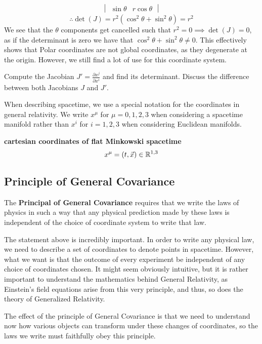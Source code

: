 \documentclass{article}
\begin{document}
\begin{exmp}
\begin{align*}
\begin{vmatrix}
 					\sin \theta & r\cos\theta
 				\end{vmatrix}
 			\end{align*}
 		\pagebreak
 			$$ \therefore \det(J) = r^2 \left( \cos^2 \theta + \sin^2 \theta \right) = r^2$$
 			We see that the $\theta$ components get cancelled such that $r^2 = 0 \implies \det(J) = 0$, as if the determinant is zero we have that $\cos^2 \theta + \sin^2 \theta \neq 0$. This effectively shows that Polar coordinates are not global coordinates, as they degenerate at the origin. However, we still find a lot of use for this coordinate system.
 			\begin{exe}
 				Compute the Jacobian $J' = \frac{\partial x^j}{\partial x^i}$ and find its determinant. Discuss the difference between both Jacobians $J$ and $J'$.
 			\end{exe}
 		\end{exmp}
 		When describing spacetime, we use a special notation for the coordinates in general relativity. We write $x^\mu$ for $\mu = 0,1,2,3$ when considering a spacetime manifold rather than $x^i$ for $i=1,2,3$ when considering Euclidean manifolds.
 		\begin{exmp}
 			\textbf{cartesian coordinates of flat Minkowski spacetime}
 			$$ x^\mu = (t, \vec{x}) \in \mathbb{R}^{1,3}$$
 		\end{exmp}
 	
 	\subsection{Principle of General Covariance}
 		\begin{defn}
 			\label{defn:GeneralCovariance}
 			The \textbf{Principal of General Covariance} requires that we write the laws of physics in such a way that any physical prediction made by these laws is independent of the choice of coordinate system to write that law.
 		\end{defn}
 		
 		The statement above is incredibly important. In order to write any physical law, we need to describe a set of coordinates to denote points in spacetime. However, what we want is that the outcome of every experiment be independent of any choice of coordinates chosen. It might seem obviously intuitive, but it is rather important to understand the mathematics behind General Relativity, as Einstein's field equations arise from this very principle, and thus, so does the theory of Generalized Relativity.
 		
 		The effect of the principle of General Covariance is that we need to understand now how various objects can transform under these changes of coordinates, so the laws we write must faithfully obey this principle. 
 		
\end{document}
